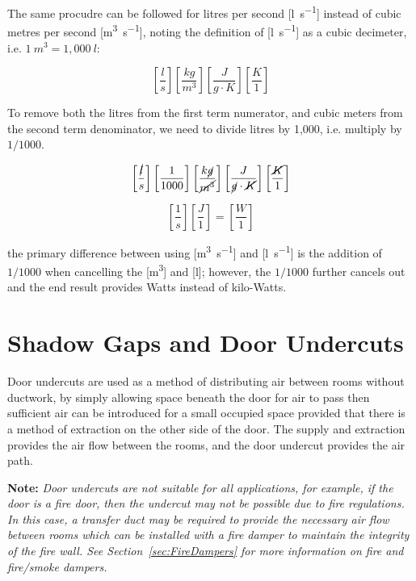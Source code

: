 The same procudre can be followed for litres per second [\si{\litre\per\second}] instead of cubic metres per second [\si{\cubic\metre\per\second}], noting the definition of [\si{\litre\per\second}] as a cubic decimeter, i.e. $1~m^3 = 1,000~l$:

\begin{equation}\label{eq:BasicEnergyBalanceDimensionalVolumetricls}
\left[ \frac{l}{s} \right] \left[ \frac{kg}{m^3} \right] \left[ \frac{J}{g\cdot K} \right] \left[ \frac{K}{1} \right]
\end{equation}

To remove both the litres from the first term numerator, and cubic meters from the second term denominator, we need to divide litres by 1,000, i.e. multiply by $1/1000$.

\begin{equation}
\left[ \frac{\cancel{l}}{s} \right] \left[ \frac{1}{1000} \right] \left[ \frac{k\cancel{g}}{\cancel{m^3}} \right] \left[ \frac{J}{\cancel{g} \cdot \cancel{K}} \right] \left[ \frac{\cancel{K}}{1} \right]
\end{equation}

\begin{equation}\label{eq:BasicEnergyBalanceDimensionalEndVolumetricls}
\left[ \frac{1}{s} \right] \left[ \frac{J}{1} \right] = \left[ \frac{W}{1} \right]
\end{equation}

the primary difference between using [\si{\cubic\metre\per\second}] and [\si{\litre\per\second}] is the addition of $1/1000$ when cancelling the [\si{\cubic\metre}] and [\si{\litre}]; however, the $1/1000$ further cancels out and the end result provides Watts instead of kilo-Watts.

\section{Shadow Gaps and Door Undercuts}
\label{sec:shadowGapsAndDoorUndercuts}

Door undercuts are used as a method of distributing air between rooms without ductwork, by simply allowing space beneath the door for air to pass then sufficient air can be introduced for a small occupied space provided that there is a method of extraction on the other side of the door.  The supply and extraction provides the air flow between the rooms, and the door undercut provides the air path.


\textbf{Note:} \textit{Door undercuts are not suitable for all applications, for example, if the door is a fire door, then the undercut may not be possible due to fire regulations. In this case, a transfer duct may be required to provide the necessary air flow between rooms which can be installed with a fire damper to maintain the integrity of the fire wall. See Section~\ref{sec:FireDampers} for more information on fire and fire/smoke dampers.}


